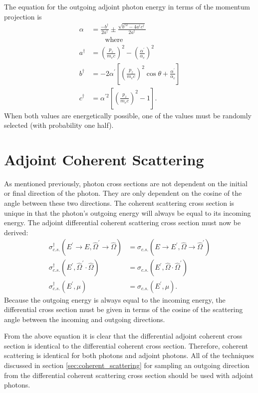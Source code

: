 The equation for the outgoing adjoint photon energy in terms of the momentum
projection is
\begin{align}
  \alpha &= \frac{-b^{\dagger}}{2a^{\dagger}} \pm 
  \frac{\sqrt{b^{\dagger 2} - 4a^{\dagger}c^{\dagger}}}{2a^{\dagger}} \\
  & \qquad \text{where} \nonumber \\
  a^{\dagger} & = \left(\frac{p_z}{m_ec}\right)^2 - 
  \left(\frac{\alpha^{'}}{\alpha_c}\right)^2
  \nonumber \\
  b^{\dagger} & = -2\alpha^{'}\left[\left(\frac{p_z}{m_ec}\right)^2\cos{\theta} + 
  \frac{\alpha^{'}}{\alpha_c}\right] \nonumber \\
  c^{\dagger} & = \alpha^{'2}\left[\left(\frac{p_z}{m_ec}\right)^2 - 1\right].
  \nonumber
\end{align}
When both values are energetically possible, one of the values must be randomly 
selected (with probability one half).

\section{Adjoint Coherent Scattering}
As mentioned previously, photon cross sections are not dependent on the 
initial or final direction of the photon. They are only dependent on the 
cosine of the angle between these two directions. The coherent scattering cross 
section is unique in that the photon's outgoing energy will always be equal
to its incoming energy. The adjoint differential coherent scattering
cross section must now be derived:
\begin{align}
  \sigma_{c.s.}^{\dagger}(E^{'} \to E, \hat{\Omega}^{'} \to \hat{\Omega}) & =
  \sigma_{c.s.}(E \to E^{'},\hat{\Omega} \to \hat{\Omega}^{'}) \nonumber \\
  \sigma_{c.s.}^{\dagger}(E^{'}, \hat{\Omega}^{'} \cdot \hat{\Omega}) & = 
  \sigma_{c.s.}(E^{'},\hat{\Omega} \cdot \hat{\Omega}^{'}) \nonumber \\
  \sigma_{c.s.}^{\dagger}(E^{'}, \mu) & = \sigma_{c.s.}(E^{'}, \mu).
\end{align}
Because the outgoing energy is always equal to the incoming energy, the
differential cross section must be given in terms of the cosine of the
scattering angle between the incoming and outgoing directions. 

From the above equation it is clear that the differential adjoint coherent
cross section is identical to the differential coherent cross section.
Therefore, coherent scattering is identical for both photons and
adjoint photons. All of the techniques discussed in section 
\ref{sec:coherent_scattering} for sampling an outgoing direction from the 
differential coherent scattering cross section should be used with adjoint
photons.

